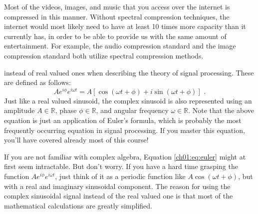 Most of the videos, images, and music that you access over the
internet is compressed in this manner. Without spectral compression
techniques, the internet would most likely need to have at least 10
times more capacity than it currently has, in order to be able to
provide us with the same amount of entertainment. For example,
the  audio compression standard and
the  image compression standard both utilize spectral
compression methods.


 instead of real valued ones when describing the theory of signal
processing. These are defined as follows:
\begin{equation}
A e^{i\phi }e^{i\omega t} = A[\cos(\omega t+\phi) + i\sin(\omega
t+\phi)] \,\,.
\label{ch01:eq:euler}
\end{equation}
Just like a real valued sinusoid, the complex sinusoid is also
represented using an amplitude $A \in \mathbb{R}$, phase
$\phi \in \mathbb{R}$, and angular frequency $\omega \in \mathbb{R}$. Note
that the above equation is just an application of Euler's
formula, which is probably the most frequently occurring
equation in signal processing. If you master this equation, you'll
have covered already most of this course!

If you are not familiar with complex algebra,
Equation \ref{ch01:eq:euler} might at first seem intractable. But
don't worry. If you have a hard time grasping the function $A e^{i\phi
}e^{i\omega t}$, just think of it as a periodic function like
$A\cos(\omega t + \phi)$, but with a real and imaginary sinusoidal
component. The reason for using the complex sinusoidal signal instead
of the real valued one is that most of the mathematical calculations
are greatly simplified.


